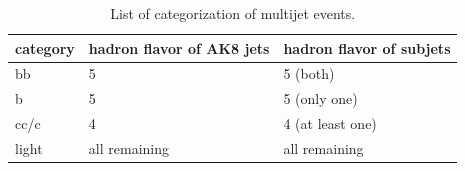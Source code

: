 \begin{table}[h!]
  \begin{center}
    \begin{tabular}{lll}
    category & hadron flavor of AK8 jets & hadron flavor of subjets \\
    \hline
    bb & 5 & 5 (both) \\
    b & 5 & 5 (only one) \\
    cc/c & 4 & 4 (at least one) \\
    light & all remaining & all remaining \\
	\hline
    \end{tabular}
  \end{center}

  \caption{List of categorization of multijet events.}
\end{table} 

